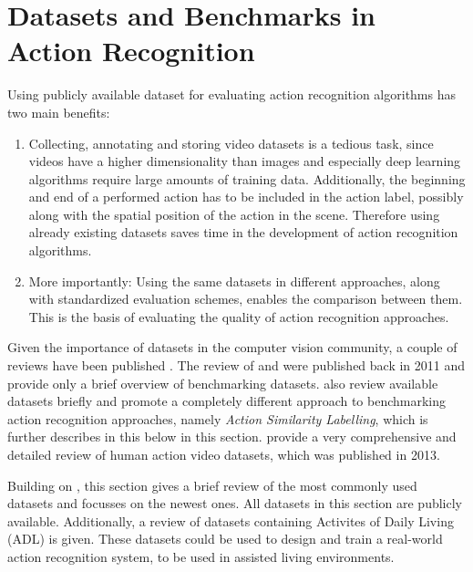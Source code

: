 \section{Datasets and Benchmarks in Action Recognition}
\label{chap:datasets}

Using publicly available dataset for evaluating action recognition algorithms has two main benefits:
\begin{enumerate}
    \item Collecting, annotating and storing video datasets is a tedious task, since videos have a higher dimensionality than images and especially deep learning algorithms require large amounts of training data. Additionally, the beginning and end of a performed action has to be included in the action label, possibly along with the spatial position of the action in the scene. Therefore using already existing datasets saves time in the development of action recognition algorithms.
    \item More importantly: Using the same datasets in different approaches, along with standardized evaluation schemes, enables the comparison between them. This is the basis of evaluating the quality of action recognition approaches. 
\end{enumerate}

Given the importance of datasets in the computer vision community, a couple of reviews have been published \cite{ahad_action_2011}\cite{liu_benchmarking_2011}\cite{hassner_critical_2013}\cite{chaquet_survey_2013}.
The review of \textcite{ahad_action_2011} and \textcite{liu_benchmarking_2011} were published back in 2011 and provide only a brief overview of benchmarking datasets.
\textcite{hassner_critical_2013} also review available datasets briefly and promote a completely different approach to benchmarking action recognition approaches, namely \textit{Action Similarity Labelling}, which is further describes in this below in this section.
\textcite{chaquet_survey_2013} provide a very comprehensive and detailed review of human action video datasets, which was published in 2013.

Building on \cite{chaquet_survey_2013}, this section gives a brief review of the most commonly used datasets and focusses on the newest ones.
All datasets in this section are publicly available.
Additionally, a review of datasets containing Activites of Daily Living (ADL) is given.
These datasets could be used to design and train a real-world action recognition system, to be used in assisted living environments.

